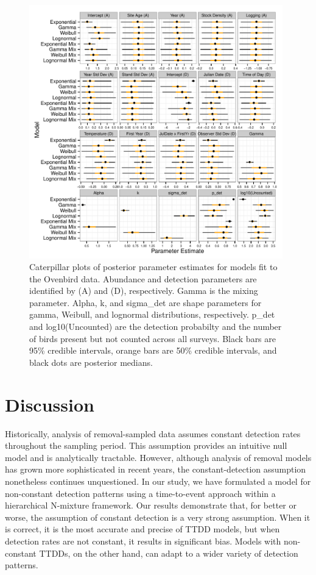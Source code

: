 \documentclass[useAMS,usenatbib,referee,12pt]{article}
\begin{document}
\begin{figure}[h!]
\includegraphics[width=0.98\textwidth]{OVEN/oven_sum/OVEN_posteriors.pdf}
\caption{\label{ovenposteriors} Caterpillar plots of posterior parameter estimates for models fit to the Ovenbird data.  Abundance and detection parameters are identified by (A) and (D), respectively.  Gamma is the mixing parameter.  Alpha, k, and sigma\_det are shape parameters for gamma, Weibull, and lognormal distributions, respectively.  p\_det and log10(Uncounted) are the detection probabilty and the number of birds present but not counted across all surveys.  Black bars are 95\% credible intervals, orange bars are 50\% credible intervals, and black dots are posterior medians.}
\end{figure}






\section{Discussion}

Historically, analysis of removal-sampled data assumes constant detection rates throughout the sampling period.  This assumption provides an intuitive null model and is analytically tractable.  However, although analysis of removal models has grown more sophisticated in recent years, the constant-detection assumption nonetheless continues unquestioned.  In our study, we have formulated a model for non-constant detection patterns using a time-to-event approach within a hierarchical N-mixture framework.  Our results demonstrate that, for better or worse, the assumption of constant detection is a very strong assumption.  When it is correct, it is the most accurate and precise of TTDD models, but when detection rates are not constant, it results in significant bias.  Models with non-constant TTDDs, on the other hand, can adapt to a wider variety of detection patterns.
\end{document}
